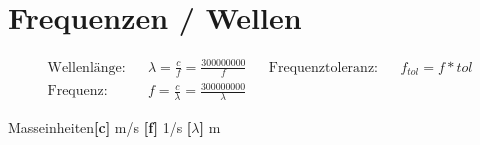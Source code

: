 \section*{Frequenzen / Wellen}

\begin{tcolorbox}[colback=white]
    \begin{align*}
        \text{Wellenlänge:}      &  & \lambda = \frac{c}{f} = \frac{\num{300000000}}{f}       &  &
        \text{Frequenztoleranz:} &  & f_{tol} = f * tol                                            \\
        \text{Frequenz:}         &  & f = \frac{c}{\lambda} = \frac{\num{300000000}}{\lambda}
    \end{align*}
    \tcblower
    \begin{center}
        Masseinheiten\textbf{[c]} m/s \hspace{1em} \textbf{[f]} 1/s  \hspace{1em} \textbf{[$\lambda$]} m
    \end{center}
\end{tcolorbox}